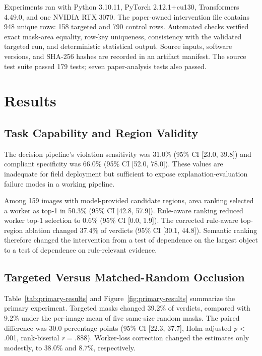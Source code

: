 \documentclass[12pt,letterpaper,twoside]{article}
\begin{document}
Experiments ran with Python 3.10.11, PyTorch 2.12.1+cu130, Transformers 4.49.0, and one NVIDIA RTX 3070. The paper-owned intervention file contains 948 unique rows: 158 targeted and 790 control rows. Automated checks verified exact mask-area equality, row-key uniqueness, consistency with the validated targeted run, and deterministic statistical output. Source inputs, software versions, and SHA-256 hashes are recorded in an artifact manifest. The source test suite passed 179 tests; seven paper-analysis tests also passed.

\section{Results}

\subsection{Task Capability and Region Validity}

The decision pipeline's violation sensitivity was 31.0\% (95\% CI [23.0, 39.8]) and compliant specificity was 66.0\% (95\% CI [52.0, 78.0]). These values are inadequate for field deployment but sufficient to expose explanation-evaluation failure modes in a working pipeline.

Among 159 images with model-provided candidate regions, area ranking selected a worker as top-1 in 50.3\% (95\% CI [42.8, 57.9]). Rule-aware ranking reduced worker top-1 selection to 0.6\% (95\% CI [0.0, 1.9]). The corrected rule-aware top-region ablation changed 37.4\% of verdicts (95\% CI [30.1, 44.8]). Semantic ranking therefore changed the intervention from a test of dependence on the largest object to a test of dependence on rule-relevant evidence.

\subsection{Targeted Versus Matched-Random Occlusion}

Table~\ref{tab:primary-results} and Figure~\ref{fig:primary-results} summarize the primary experiment. Targeted masks changed 39.2\% of verdicts, compared with 9.2\% under the per-image mean of five same-size random masks. The paired difference was 30.0 percentage points (95\% CI [22.3, 37.7], Holm-adjusted \textit{p} < .001, rank-biserial \textit{r} = .888). Worker-loss correction changed the estimates only modestly, to 38.0\% and 8.7\%, respectively.
\end{document}
